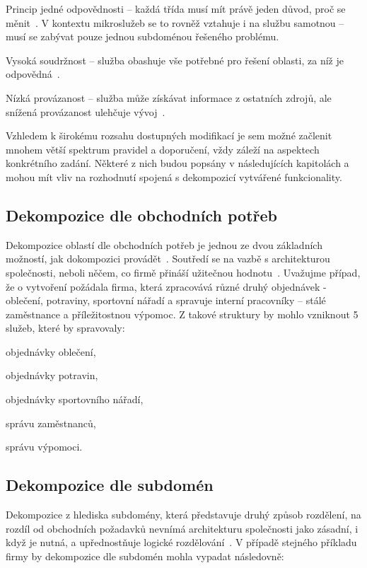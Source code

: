 \begin{dl}
   \item[Princip jedné odpovědnosti] – každá třída musí mít právě jeden důvod, proč se měnit~\cite{srp}.
   V kontextu mikroslužeb se to rovněž vztahuje i na službu samotnou – musí se zabývat pouze jednou subdoménou řešeného problému.
   \item[Vysoká soudržnost] – služba obashuje vše potřebné pro řešení oblasti, za níž je odpovědná~\cite{lchc}.
   \item[Nízká provázanost] – služba může získávat informace z ostatních zdrojů, ale snížená provázanost ulehčuje vývoj~\cite{lchc}.
\end{dl}


Vzhledem k širokému rozsahu dostupných modifikací  je sem možné začlenit mnohem větší spektrum pravidel a doporučení, vždy záleží na aspektech konkrétního zadání.
Některé z nich budou popsány v následujících kapitolách a mohou mít vliv na rozhodnutí spojená s dekompozicí vytvářené funkcionality.



\subsection{Dekompozice dle obchodních potřeb}\label{subsec:msa-decomposition-business}
Dekompozice oblastí dle obchodních potřeb je jednou ze dvou základních možností, jak dokompozici provádět~\cite{msachris}.
Soutředí se na vazbě s architekturou společnosti, neboli něčem, co firmě přináší užitečnou hodnotu~\cite{decompbusiness}.
Uvažujme případ, že o vytvoření  požádala firma, která zpracovává různé druhý objednávek - oblečení, potraviny, sportovní nářadí a spravuje interní pracovníky – stálé zaměstnance a příležitostnou výpomoc.
Z takové struktury by mohlo vzniknout 5 služeb, které by spravovaly:


\begin{ul}
   \item objednávky oblečení,
   \item objednávky potravin,
   \item objednávky sportovního nářadí,
   \item správu zaměstnanců,
   \item správu výpomoci.
\end{ul}



\subsection{Dekompozice dle subdomén}\label{subsec:msa-decomposition-domain}
Dekompozice z hlediska subdomény, která představuje druhý způsob rozdělení, na rozdíl od obchodních požadavků nevnímá architekturu společnosti jako zásadní, i když je nutná, a upřednostňuje logické rozdělování~\cite{decompsubdomain}.
V případě stejného příkladu firmy by dekompozice dle subdomén mohla vypadat následovně:


